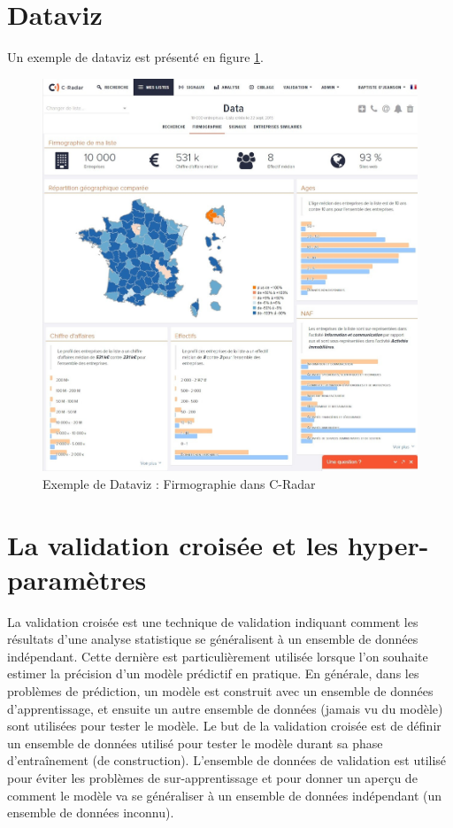 \section{Dataviz}
\label{annexe:firmo}
    Un exemple de dataviz est présenté en figure \ref{fig:firmo}.
    \begin{figure}[h!]
        \centering
        \includegraphics[width=\textwidth]{images/firmo.jpg}
        \caption{Exemple de Dataviz : Firmographie dans C-Radar}
        \label{fig:firmo}
    \end{figure}

\section{La validation croisée et les hyper-paramètres}
\label{annexe:cv}
    La validation croisée est une technique de validation indiquant comment les résultats d'une analyse statistique se généralisent à un ensemble de données indépendant. Cette dernière est particulièrement utilisée lorsque l'on souhaite estimer la précision d'un modèle prédictif en pratique. En générale, dans les problèmes de prédiction, un modèle est construit avec un ensemble de données d'apprentissage, et ensuite un autre ensemble de données (jamais vu du modèle) sont utilisées pour tester le modèle. Le but de la validation croisée est de définir un ensemble de données utilisé pour tester le modèle durant sa phase d’entraînement (de construction). L'ensemble de données de validation est utilisé pour éviter les problèmes de sur-apprentissage et pour donner un aperçu de comment le modèle va se généraliser à un ensemble de données indépendant (un ensemble de données inconnu).\\

